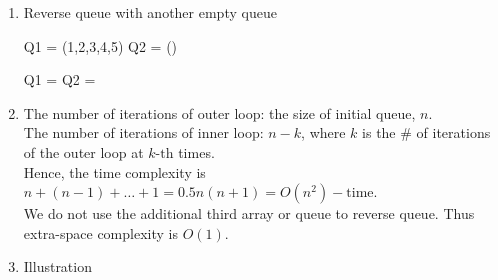 \documentclass[12pt]{article}
\begin{document}
\begin{enumerate}
  \item
    Reverse queue with another empty queue\par
    \begin{minipage}{.7\linewidth}
    \begin{algorithm}[H]

        Q1 = \KwInitQueue(1,2,3,4,5)\;
        Q2 = \KwInitQueue()\;

        {
          {
               Q1 = \;
          }
          Q2 = \;
        }
    \end{algorithm}
    \end{minipage}
  \item 
    The number of iterations of outer loop: the size of initial queue, $n$.\\
    The number of iterations of inner loop: $n-k$, where $k$ is the \# of iterations of the outer loop at $k\text{-th}$ times.\\
    Hence, the time complexity is $n+(n-1)+\dots+1=0.5n(n+1)=O(n^2)-\text{time}$.\\
    We do not use the additional third array or queue to reverse queue. Thus extra-space complexity is $O(1)$.
  \item Illustration\par 



\begin{tikzpicture}[x=0.75pt,y=0.75pt,yscale=-1,xscale=1]


\end{tikzpicture}
\end{enumerate}
\end{document}

